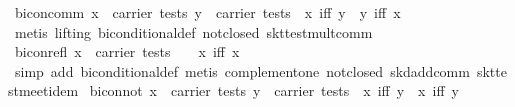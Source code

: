 \begin{isabellebody}
\ bicon{}comm{}\ {}{}x\ {}\ carrier\ tests{}\ y\ {}\ carrier\ tests{}\ {}\ x\ iff\ y\ {}\ y\ iff\ x{}\isanewline
%
\isadelimproof
\ \ %
\endisadelimproof
%
\isatagproof
{}\isamarkupfalse%
\ {}metis\ {}lifting{}\ biconditional{}def\ not{}closed\ skt{}test{}mult{}comm{}%
\endisatagproof
{\isafoldproof}%
%
\isadelimproof
\isanewline
%
\endisadelimproof
\isanewline
{}\isamarkupfalse%
\ bicon{}refl{}\ {}x\ {}\ carrier\ tests\ {}\ {}\ {}\ x\ iff\ x{}\isanewline
%
\isadelimproof
\ \ %
\endisadelimproof
%
\isatagproof
{}\isamarkupfalse%
\ {}simp\ add{}\ biconditional{}def{}\ {}metis\ complement{}one\ not{}closed\ skd{}add{}comm\ skt{}test{}meet{}idem{}%
\endisatagproof
{\isafoldproof}%
%
\isadelimproof
\isanewline
%
\endisadelimproof
\isanewline
{}\isamarkupfalse%
\ bicon{}not{}\ {}{}x\ {}\ carrier\ tests{}\ y\ {}\ carrier\ tests{}\ {}\ x\ iff\ y\ {}\ {}x\ iff\ {}y{}\isanewline

\end{isabellebody}
